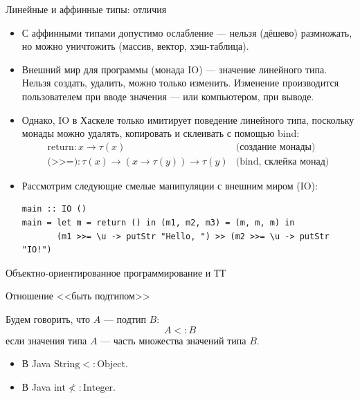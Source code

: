 \documentclass[aspectratio=169,dvipsnames,usenames]{beamer}
\begin{document}
\begin{frame}[fragile]{Линейные и аффинные типы: отличия}
\begin{itemize}
\item С аффинными типами допустимо ослабление --- нельзя (дёшево) размножать, но можно уничтожить
(массив, вектор, хэш-таблица).

\item Внешний мир для программы (монада IO) --- значение линейного типа.
Нельзя создать, удалить, можно только изменить.
Изменение производится пользователем при вводе значения --- или компьютером, при выводе.

\item Однако, IO в Хаскеле только имитирует поведение линейного типа, поскольку монады
можно удалять, копировать и склеивать с помощью bind:
$$\begin{array}{ll}\text{return}: x \rightarrow \tau(x) & \text{(создание монады)}\\
\texttt{(>{}>{}=)}: \tau(x) \rightarrow (x \rightarrow \tau(y)) \rightarrow \tau(y) & \text{(bind, склейка монад)}\end{array}$$

\item Рассмотрим следующие смелые манипуляции с внешним миром (IO):
\small\begin{verbatim}
main :: IO ()
main = let m = return () in (m1, m2, m3) = (m, m, m) in 
       (m1 >>= \u -> putStr "Hello, ") >> (m2 >>= \u -> putStr "IO!")
\end{verbatim}
\end{itemize}
\end{frame}


\begin{frame}{}
\begin{center}
{\LARGE Объектно-ориентированное программирование и ТТ}
\end{center}
\end{frame}

\begin{frame}{Отношение <<быть подтипом>>}
\begin{dfn}
Будем говорить, что $A$ --- подтип $B$: $$A <: B$$
если значения типа $A$ --- часть множества значений типа $B$.
\end{dfn}
\begin{exm}
\begin{itemize}
\item В Java $\text{String} <: \text{Object}$.
\item В Java $\text{int} \not<: \text{Integer}$.
\end{itemize}
\end{exm}
\end{frame}
\end{document}
